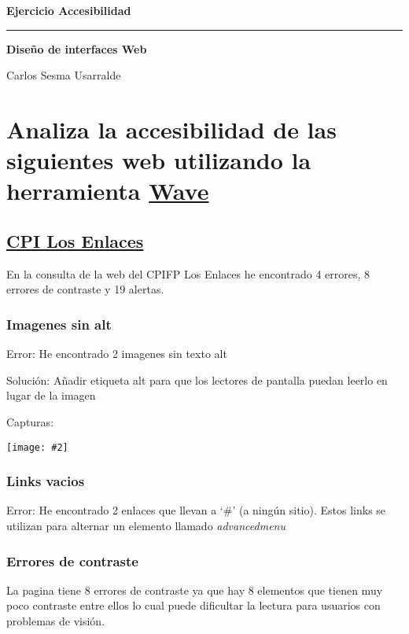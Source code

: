 \documentclass[a4paper,12pt]{article} %
\newcommand{\image}[2][1]{\texttt{[image: \#2]}}
\newcommand{\Nombre}{Carlos Sesma Usarralde}
\newcommand{\Proyecto}{Ejercicio Accesibilidad}
\begin{document}
\cfoot{\thepage}
\begin{titlepage}
    \begin{center}
        \huge\textbf{\Proyecto}
    \end{center}
    \hfill{}
    {\color{accentColor}\hrule}
    \vfill{}
    \begin{center}
        \huge\textbf{Diseño de interfaces Web}
    \end{center}
    \vfill{}
    \begin{center}
        {\large{} \Nombre}
    \end{center}
\end{titlepage}
\clearpage{}
\tableofcontents{}

\thispagestyle{empty}
\clearpage{}
\section{Analiza la accesibilidad de las siguientes web utilizando la herramienta \href{https://wave.webaim.org/}{Wave}}
\subsection{\href{http://www.cpilosenlaces.com}{CPI Los Enlaces}}
En la consulta de la web del CPIFP Los Enlaces he encontrado 4 errores, 8 errores de contraste y 19 alertas.
\subsubsection{Imagenes sin alt }
Error: He encontrado 2 imagenes sin texto alt

Solución: Añadir etiqueta alt para que los lectores de pantalla puedan leerlo en lugar de la imagen

Capturas:

\image{1}
\subsubsection{Links vacios }
Error: He encontrado 2 enlaces que llevan a `\#' (a ningún sitio). Estos links se utilizan para alternar un elemento llamado \textit{advancedmenu}


\subsubsection{Errores de contraste}
La pagina tiene 8 errores de contraste ya que hay 8 elementos que tienen muy poco contraste entre ellos lo cual puede dificultar la lectura para usuarios con problemas de visión.
\end{document}
